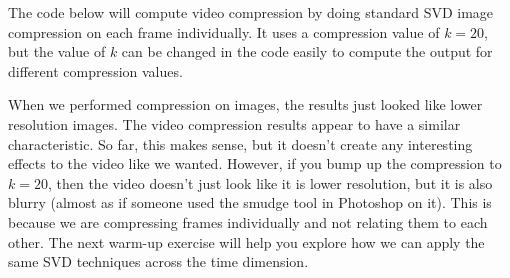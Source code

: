 The code below will compute video compression by doing standard SVD image compression on each frame individually. It uses a compression value of $k = 20$, but the value of $k$ can be changed in the code easily to compute the output for different compression values.


When we performed compression on images, the results just looked like lower resolution images. The video compression results appear to have a similar characteristic. So far, this makes sense, but it doesn't create any interesting effects to the video like we wanted. However, if you bump up the compression to $k = 20$, then the video doesn't just look like it is lower resolution, but it is also blurry (almost as if someone used the smudge tool in Photoshop on it). This is because we are compressing frames individually and not relating them to each other. The next warm-up exercise will help you explore how we can apply the same SVD techniques across the time dimension.